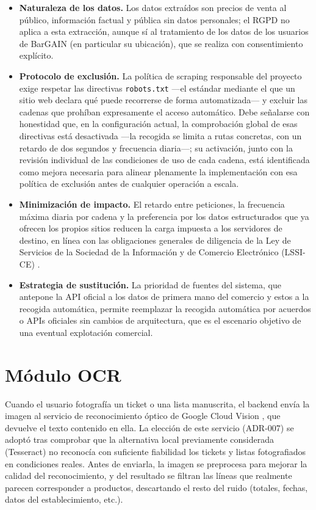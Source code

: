 \begin{itemize}
  \item \textbf{Naturaleza de los datos.} Los datos extra\'idos son precios de venta al
    p\'ublico, informaci\'on factual y p\'ublica sin datos personales; el RGPD \cite{rgpd2016}
    no aplica a esta extracci\'on, aunque s\'i al tratamiento de los datos de los usuarios de
    BarGAIN (en particular su ubicaci\'on), que se realiza con consentimiento expl\'icito.
  \item \textbf{Protocolo de exclusi\'on.} La pol\'itica de scraping responsable del proyecto exige
    respetar las directivas \texttt{robots.txt} \cite{rfc9309} ---el est\'andar mediante el que un
    sitio web declara qu\'e puede recorrerse de forma automatizada--- y excluir las cadenas que
    proh\'iban expresamente el acceso autom\'atico. Debe se\~nalarse con honestidad que, en la
    configuraci\'on actual, la comprobaci\'on global de esas directivas est\'a desactivada ---la
    recogida se limita a rutas concretas, con un retardo de dos segundos y frecuencia diaria---; su
    activaci\'on, junto con la revisi\'on individual de las condiciones de uso de cada cadena, est\'a
    identificada como mejora necesaria para alinear plenamente la implementaci\'on con esa pol\'itica
    de exclusi\'on antes de cualquier operaci\'on a escala.
  \item \textbf{Minimizaci\'on de impacto.} El retardo entre peticiones, la frecuencia m\'axima
    diaria por cadena y la preferencia por los datos estructurados que ya ofrecen los propios
    sitios reducen la carga impuesta a los servidores de destino, en l\'inea con las obligaciones
    generales de diligencia de la Ley de Servicios de la Sociedad de la Informaci\'on y de
    Comercio Electr\'onico (LSSI-CE) \cite{lssi2002}.
  \item \textbf{Estrategia de sustituci\'on.} La prioridad de fuentes del sistema, que antepone la
    API oficial a los datos de primera mano del comercio y estos a la recogida autom\'atica, permite
    reemplazar la recogida autom\'atica por acuerdos o APIs oficiales sin cambios de arquitectura,
    que es el escenario objetivo de una eventual explotaci\'on comercial.
\end{itemize}

\section{M\'odulo OCR}\label{sec:ocr}

Cuando el usuario fotograf\'ia un ticket o una lista manuscrita, el backend env\'ia la imagen al
servicio de reconocimiento \'optico de Google Cloud Vision \cite{vision_docs}, que devuelve el texto
contenido en ella. La elecci\'on de este servicio (ADR-007) se adopt\'o tras comprobar que la
alternativa local previamente considerada (Tesseract) no reconoc\'ia con suficiente fiabilidad los
tickets y listas fotografiados en condiciones reales. Antes de enviarla, la imagen se preprocesa
para mejorar la calidad del reconocimiento, y del resultado se filtran las l\'ineas que realmente
parecen corresponder a productos, descartando el resto del ruido (totales, fechas, datos del
establecimiento, etc.).


